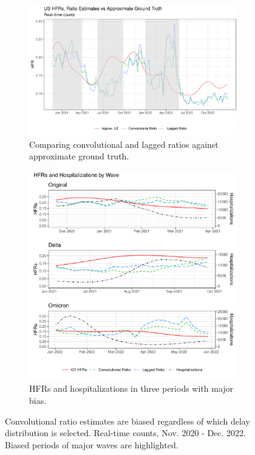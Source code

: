 \documentclass{article}
\begin{document}
\begin{figure}
     \centering
     \begin{subfigure}[b]{0.55\linewidth}
         \centering
         \includegraphics[width=\linewidth]{Figs/Real/US_ests_realtime.pdf}
         \caption{Comparing convolutional and lagged ratios against approximate ground truth.}
         \label{fig:basic_est_vs_gt}
     \end{subfigure}
     \hfill
     \begin{subfigure}[b]{0.4\linewidth}
         \centering
         \includegraphics[width=\linewidth]{Figs/Real/hfrs_by_wave.pdf}
         \caption{HFRs and hospitalizations in three periods with major bias.} 
         \label{fig:wave}
     \end{subfigure}
        \caption{Convolutional ratio estimates are biased regardless of which delay distribution is selected. Real-time counts, Nov. 2020 - Dec. 2022. Biased periods of major waves are highlighted.}
        \label{fig:basic_est_vs_gt_figs}
\end{figure}
\end{document}

